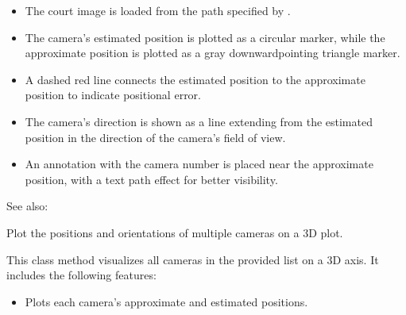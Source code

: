 \documentclass[letterpaper,10pt,english]{sphinxmanual}
\begin{document}
\begin{fulllineitems}
\begin{fulllineitems}
\begin{itemize}
\item {} 
\sphinxAtStartPar
The court image is loaded from the path specified by .

\item {} 
\sphinxAtStartPar
The camera’s estimated position is plotted as a circular marker, while the
approximate position is plotted as a gray downward\sphinxhyphen{}pointing triangle marker.

\item {} 
\sphinxAtStartPar
A dashed red line connects the estimated position to the approximate position to
indicate positional error.

\item {} 
\sphinxAtStartPar
The camera’s direction is shown as a line extending from the estimated position
in the direction of the camera’s field of view.

\item {} 
\sphinxAtStartPar
An annotation with the camera number is placed near the approximate position,
with a text path effect for better visibility.

\end{itemize}


\begin{sphinxseealso}{See also:}

\sphinxAtStartPar
{\hyperref[\detokenize{CameraUtils:id19}]{}}


\end{sphinxseealso}


\end{fulllineitems}


\begin{fulllineitems}
\label{\detokenize{CameraUtils:id18}}
\pysigstartsignatures
{}
\pysigstopsignatures
\sphinxAtStartPar
Plot the positions and orientations of multiple cameras on a 3D plot.

\sphinxAtStartPar
This class method visualizes all cameras in the provided list on a 3D axis. It
includes the following features:
\begin{itemize}
\item {} 
\sphinxAtStartPar
Plots each camera’s approximate and estimated positions.


\end{itemize}
\end{fulllineitems}
\end{fulllineitems}
\end{document}
